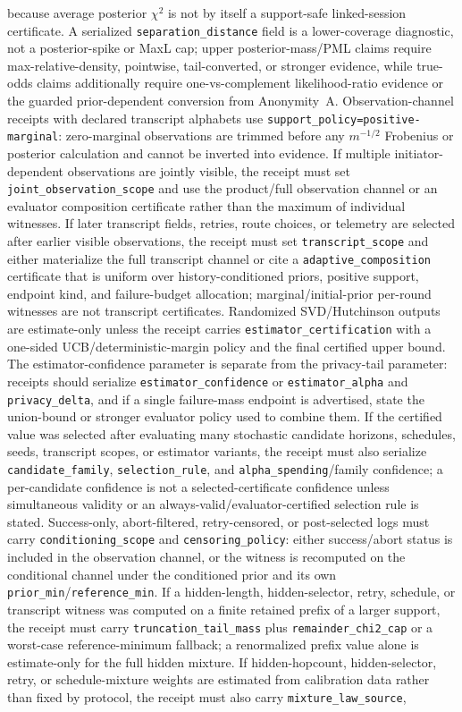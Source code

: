 \documentclass[11pt]{article}
\begin{document}
because average posterior $\chi^2$ is not by itself a support-safe linked-session certificate. A serialized \texttt{separation\_distance} field is a lower-coverage diagnostic, not a posterior-spike or MaxL cap; upper posterior-mass/PML claims require max-relative-density, pointwise, tail-converted, or stronger evidence, while true-odds claims additionally require one-vs-complement likelihood-ratio evidence or the guarded prior-dependent conversion from Anonymity~A. Observation-channel receipts with declared transcript alphabets use \texttt{support\_policy=positive-marginal}: zero-marginal observations are trimmed before any $m^{-1/2}$ Frobenius or posterior calculation and cannot be inverted into evidence. If multiple initiator-dependent observations are jointly visible, the receipt must set \nolinkurl{joint_observation_scope} and use the product/full observation channel or an evaluator composition certificate rather than the maximum of individual witnesses. If later transcript fields, retries, route choices, or telemetry are selected after earlier visible observations, the receipt must set \nolinkurl{transcript_scope} and either materialize the full transcript channel or cite a \nolinkurl{adaptive_composition} certificate that is uniform over history-conditioned priors, positive support, endpoint kind, and failure-budget allocation; marginal/initial-prior per-round witnesses are not transcript certificates. Randomized SVD/Hutchinson outputs are estimate-only unless the receipt carries \nolinkurl{estimator_certification} with a one-sided UCB/deterministic-margin policy and the final certified upper bound.  The estimator-confidence parameter is separate from the privacy-tail parameter: receipts should serialize \nolinkurl{estimator_confidence} or \nolinkurl{estimator_alpha} and \nolinkurl{privacy_delta}, and if a single failure-mass endpoint is advertised, state the union-bound or stronger evaluator policy used to combine them. If the certified value was selected after evaluating many stochastic candidate horizons, schedules, seeds, transcript scopes, or estimator variants, the receipt must also serialize \nolinkurl{candidate_family}, \nolinkurl{selection_rule}, and \nolinkurl{alpha_spending}/family confidence; a per-candidate confidence is not a selected-certificate confidence unless simultaneous validity or an always-valid/evaluator-certified selection rule is stated. Success-only, abort-filtered, retry-censored, or post-selected logs must carry \nolinkurl{conditioning_scope} and \nolinkurl{censoring_policy}: either success/abort status is included in the observation channel, or the witness is recomputed on the conditional channel under the conditioned prior and its own \texttt{prior\_min}/\texttt{reference\_min}. If a hidden-length, hidden-selector, retry, schedule, or transcript witness was computed on a finite retained prefix of a larger support, the receipt must carry \nolinkurl{truncation_tail_mass} plus \nolinkurl{remainder_chi2_cap} or a worst-case reference-minimum fallback; a renormalized prefix value alone is estimate-only for the full hidden mixture. If hidden-hopcount, hidden-selector, retry, or schedule-mixture weights are estimated from calibration data rather than fixed by protocol, the receipt must also carry \nolinkurl{mixture_law_source}, 
\end{document}
